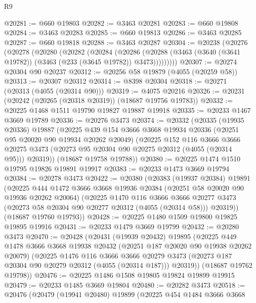 \begin{lexlean}{R9}
\begin{coremodule}
@20281 := @660 @19803
@20282 := @3463 @20281
@20283 := @660 @19808
@20284 := @3463 @20283
@20285 := @660 @19813
@20286 := @3463 @20285
@20287 := @660 @19818
@20288 := @3463 @20287
@20304 := @20238
    (@20276
      (@20278
        (@20280
          (@20282
            (@20284
              (@20286
                (@20288 (@3463 (@3640 (@3641 @19782)) (@3463 (@233 (@3645 @19782)) @3473)))))))))
@20307 := @20274 @20304 @90 @20237
@20312 := @20256 @58 @19879 (@4055 (@20259 @58))
@20313 := @20307 @20312
@20314 := @8398 @20304
@20318 := @20271 (@20313 (@4055 (@20314 @90)))
@20319 := @4075 @20216
@20326 := @20231 (@20242 (@20265 (@20318 @20319)) (@18687 @19756 @19783))
@20332 := @20225 @1468 @1511 @19790 @19827 @19887 @19918
@20335 := @20233 @1467 @3669 @19789
@20336 := @20276 @3473
@20374 := @20332
    (@20335
      (@19935 @20336)
      @19887
      (@20225
        @439
        @154
        @3666
        @3668
        @19934
        @20336
        (@20251 @95 @20020 @90 @19934 @20262 @20049)
        (@20225
          @152
          @116
          @3666
          @3666
          @20275
          @3473
          (@20273 @95 @20304 @90 @20275 @20312 (@4055 (@20314 @95)))
          @20319))
      (@18687 @19758 @19788))
@20380 := @20225 @1474 @1510 @19795 @19826 @19891 @19917
@20383 := @20233 @1473 @3669 @19794
@20384 := @20278 @3473
@20422 := @20380
    (@20383
      (@19937 @20384)
      @19891
      (@20225
        @444
        @1472
        @3666
        @3668
        @19936
        @20384
        (@20251 @58 @20020 @90 @19936 @20262 @20064)
        (@20225
          @1470
          @116
          @3666
          @3666
          @20277
          @3473
          (@20273 @58 @20304 @90 @20277 @20312 (@4055 (@20314 @58)))
          @20319))
      (@18687 @19760 @19793))
@20428 := @20225 @1480 @1509 @19800 @19825 @19895 @19916
@20431 := @20233 @1479 @3669 @19799
@20432 := @20280 @3473
@20470 := @20428
    (@20431
      (@19939 @20432)
      @19895
      (@20225
        @449
        @1478
        @3666
        @3668
        @19938
        @20432
        (@20251 @187 @20020 @90 @19938 @20262 @20079)
        (@20225
          @1476
          @116
          @3666
          @3666
          @20279
          @3473
          (@20273 @187 @20304 @90 @20279 @20312 (@4055 (@20314 @187)))
          @20319))
      (@18687 @19762 @19798))
@20476 := @20225 @1486 @1508 @19805 @19824 @19899 @19915
@20479 := @20233 @1485 @3669 @19804
@20480 := @20282 @3473
@20518 := @20476
    (@20479
      (@19941 @20480)
      @19899
      (@20225
        @454
        @1484
        @3666
        @3668

\end{coremodule}
\end{lexlean}
